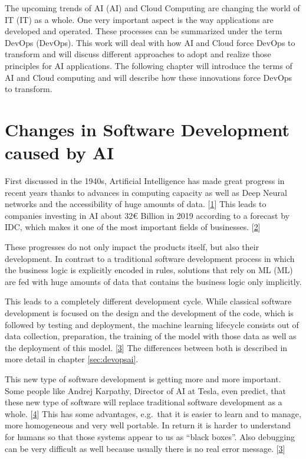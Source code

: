 \documentclass[12pt,english,a4paper,oneside,,tablecaptionabove]{scrbook}
\begin{document}
The upcoming trends of \acl{AI} (\acs{AI}) and Cloud Computing are
changing the world of \acl{IT} (\acs{IT}) as a whole. One very important
aspect is the way applications are developed and operated. These
processes can be summarized under the term \acl{DevOps} (\acs{DevOps}).
This work will deal with how AI and Cloud force DevOps to transform and
will discuss different approaches to adopt and realize those principles
for AI applications. The following chapter will introduce the terms of
AI and Cloud computing and will describe how these innovations force
DevOps to transform.

\hypertarget{sec:devchanges}{%
\section{Changes in Software Development caused by
AI}\label{sec:devchanges}}

First discussed in the 1940s, Artificial Intelligence has made great
progress in recent years thanks to advances in computing capacity as
well as Deep Neural networks and the accessibility of huge amounts of
data. {[}\protect\hyperlink{ref-JanakiramMSV}{1}{]} This leads to
companies investing in AI about 32€ Billion in 2019 according to a
forecast by IDC, which makes it one of the most important fields of
businesses. {[}\protect\hyperlink{ref-MichaelShirer}{2}{]}

These progresses do not only impact the products itself, but also their
development. In contrast to a traditional software development process
in which the business logic is explicitly encoded in rules, solutions
that rely on \acl{ML} (\acs{ML}) are fed with huge amounts of data that
contains the business logic only implicitly.

This leads to a completely different development cycle. While classical
software development is focused on the design and the development of the
code, which is followed by testing and deployment, the machine learning
lifecycle consists out of data collection, preparation, the training of
the model with those data as well as the deployment of this model.
{[}\protect\hyperlink{ref-MariyaYao}{3}{]} The differences between both
is described in more detail in chapter \ref{sec:devopsai}.

This new type of software development is getting more and more
important. Some people like Andrej Karpathy, Director of AI at Tesla,
even predict, that these new type of software will replace traditional
software development as a whole.
{[}\protect\hyperlink{ref-AndrejKarpathy}{4}{]} This has some
advantages, e.g.~that it is easier to learn and to manage, more
homogeneous and very well portable. In return it is harder to understand
for humans so that those systems appear to us as \enquote{black boxes}.
Also debugging can be very difficult as well because usually there is no
real error message. {[}\protect\hyperlink{ref-MariyaYao}{3}{]}
\end{document}
